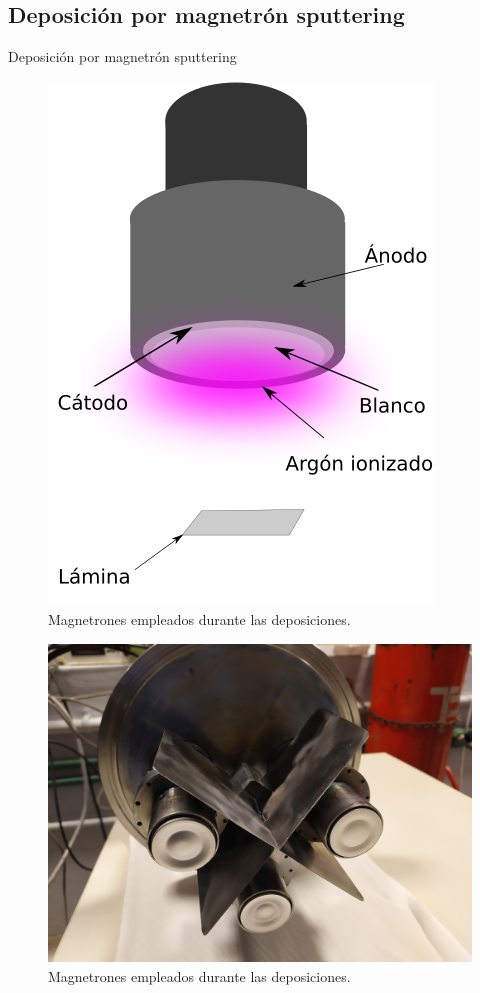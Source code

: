 \documentclass[11pt]{beamer}
\begin{document}
\subsection{Deposición por magnetrón sputtering}
\begin{frame}{Deposición por magnetrón sputtering}
\begin{figure}[H]
	\centering
	\includegraphics[scale=0.1]{img/SchemaDeposition.png}
	\caption{Magnetrones empleados durante las deposiciones.}
	\label{magnetrones}
\end{figure}
\begin{figure}[H]
	\centering
	\includegraphics[scale=0.1]{img/magnetrones.jpg}
	\caption{Magnetrones empleados durante las deposiciones.}
	\label{magnetrones}
\end{figure}
\end{frame}
\end{document}
